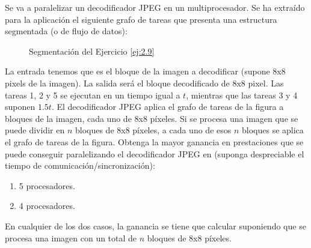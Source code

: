 \begin{ejercicio} \label{ej:2.9}
    Se va a paralelizar un decodificador JPEG en un multiprocesador. Se ha extraído para la aplicación
    el siguiente grafo de tareas que presenta una estructura segmentada (o de flujo de datos):
    \begin{figure}[H]
        \centering
        \caption{Segmentación del Ejercicio \ref{ej:2.9}}
    \end{figure}
    La entrada tenemos que es el bloque de la imagen a decodificar (supone 8x8 pixels de la imagen).
    La salida será el bloque decodificado de 8x8 pixel. Las tareas 1, 2 y 5 se ejecutan en un tiempo igual a $t$,
    mientras que las tareas 3 y 4 suponen $1.5t$. El decodificador JPEG aplica el grafo de tareas de la figura a bloques de la imagen, cada uno de 8x8 píxeles. Si
    se procesa una imagen que se puede dividir en $n$ bloques de 8x8 píxeles, a cada uno de esos $n$ bloques se
    aplica el grafo de tareas de la figura. Obtenga la mayor ganancia en prestaciones que se puede conseguir
    paralelizando el decodificador JPEG en (suponga despreciable el tiempo de comunicación/sincronización):
    \begin{enumerate}
        \item 5 procesadores.
        \item 4 procesadores.
    \end{enumerate}

    En cualquier de los dos casos, la ganancia se tiene que calcular suponiendo que se procesa una imagen con un total de $n$ bloques de 8x8 píxeles.
\end{ejercicio}


